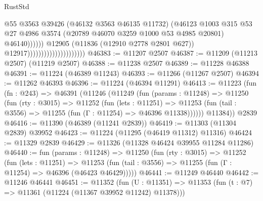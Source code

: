 \begin{lexlean}{RustStd}
\begin{coremodule}
                                                        @55
                                                        @3563
                                                        @39426
                                                        (@46132 @3563 @46135 @11732)
                                                        (@46123
                                                          @1003
                                                          @315
                                                          @53
                                                          @27
                                                          @4986
                                                          @3574
                                                          (@20789
                                                            @46070
                                                            @3259
                                                            @1000
                                                            @53
                                                            @4985
                                                            @20801)
                                                          @46140))))))
                                              @12905
                                              (@11836 (@12910 @2778 @2801 @627))
                                              @12917)))))))))))))))))))))
@46383 := @11207 @2507
@46387 := @11209 (@11213 @2507) (@11219 @2507)
@46388 := @11238 @2507
@46389 := @11228 @46388
@46391 := @11224 (@46389 @11243)
@46393 := @11266 (@11267 @2507)
@46394 := @11262 @46393
@46396 := @11224 (@46394 @11291)
@46413 := @11223
    (fun (fn : @243) =>
    @46391
      (@11246
        (@11249
          (fun (params : @11248) =>
          @11250
            (fun (rty : @3015) =>
            @11252
              (fun (lets : @11251) =>
              @11253 (fun (tail : @3556) => @11255 (fun (Γ : @11254) => @46396 @11338))))))
        @11384))
    @2839
@46416 := @11390 (@46389 (@11241 @2839))
@46419 := @11303 (@11304 @2839) @39952
@46423 := @11224 (@11295 (@46419 @11312) @11316)
@46424 := @11329 @2839
@46429 := @11326 (@11328 @46424 @39955 @11284 @11286)
@46440 := fun (params : @11248) =>
  @11250
    (fun (rty : @3015) =>
    @11252
      (fun (lets : @11251) =>
      @11253 (fun (tail : @3556) => @11255 (fun (Γ : @11254) => @46396 (@46423 @46429)))))
@46441 := @11249 @46440
@46442 := @11246 @46441
@46451 := @11352
    (fun (U : @11351) => @11353 (fun (t : @7) => @11361 (@11224 (@11367 @39952 @11242) @11378)))

\end{coremodule}
\end{lexlean}
